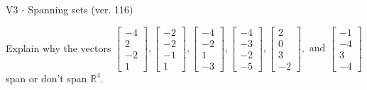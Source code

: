 \begin{exercise}
  \begin{exerciseTitle}V3 - Spanning sets (ver. 116)\end{exerciseTitle}
  \begin{exerciseStatement}
    Explain why the vectors \(\left[\begin{array}{r}
-4 \\
2 \\
-2 \\
1
\end{array}\right] , \left[\begin{array}{r}
-2 \\
-2 \\
-1 \\
1
\end{array}\right] , \left[\begin{array}{r}
-4 \\
-2 \\
1 \\
-3
\end{array}\right] , \left[\begin{array}{r}
-4 \\
-3 \\
-2 \\
-5
\end{array}\right] , \left[\begin{array}{r}
2 \\
0 \\
3 \\
-2
\end{array}\right] , \text{ and } \left[\begin{array}{r}
-1 \\
-4 \\
3 \\
-4
\end{array}\right]\) span or don't span \(\mathbb{R}^4\). 
	



\end{exerciseStatement}
\end{exercise}
